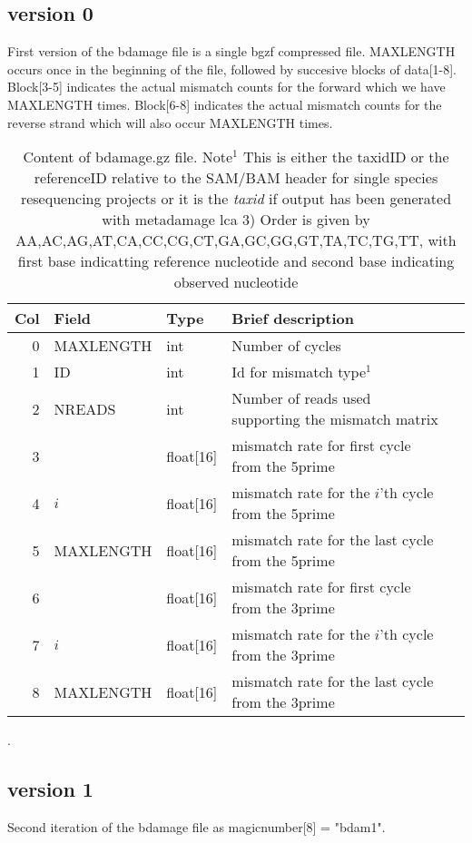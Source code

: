 \documentclass[10pt]{article}
\begin{document}
\subsection{version 0}
First version of the bdamage file is a single bgzf compressed file. MAXLENGTH occurs once in the beginning of the file, followed by succesive blocks of data[1-8]. Block[3-5] indicates the actual mismatch counts for the forward which we have MAXLENGTH times. Block[6-8] indicates the actual mismatch counts for the reverse strand which will also occur MAXLENGTH times. 
\begin{table}[h!]
\begin{tabular}{rllll}
  \hline
  {\bf Col} & {\bf Field} & {\bf Type} & {\bf Brief description} \\
  \hline
  0 & {\sf MAXLENGTH} & int &  Number of cycles\\\hline
  1 & {\sf ID} & int &  Id for mismatch type$^1$\\
  2 & {\sf NREADS} & int & Number of reads used supporting the mismatch matrix\\\hline\hline
  3 & {\sf 1} & float[16] & mismatch rate for first cycle from the 5prime\\
  4 & {\sf $i$} & float[16] & mismatch rate for the $i$'th cycle from the 5prime\\
  5 & {\sf MAXLENGTH} & float[16] & mismatch rate for the last cycle from the 5prime\\\hline
  6 & {\sf 1} & float[16] & mismatch rate for first cycle from the 3prime\\
  7 & {\sf $i$} & float[16] & mismatch rate for the $i$'th cycle from the 3prime\\
  8 & {\sf MAXLENGTH} & float[16] & mismatch rate for the last cycle from the 3prime\\\hline
  \hline
\end{tabular}\label{tab1}
\caption{Content of bdamage.gz file. Note$^1$ This is either the taxidID or the referenceID relative to the SAM/BAM header for single species resequencing projects or it is the \textit{taxid} if output has been generated with metadamage lca 3) Order is given by AA,AC,AG,AT,CA,CC,CG,CT,GA,GC,GG,GT,TA,TC,TG,TT, with first base indicatting reference nucleotide and second base indicating observed nucleotide}.
\end{table}

\subsection{version 1}
Second iteration of the bdamage file as magicnumber[8] = "bdam1".
\clearpage
\end{document}
